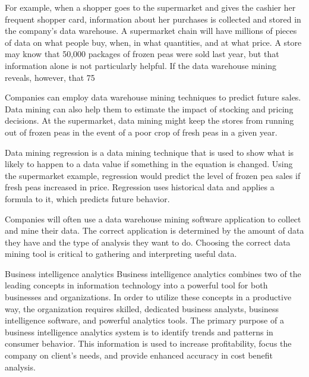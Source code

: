 For example, when a shopper goes to the supermarket and gives the cashier her frequent shopper card, information about her purchases is collected and stored in the company's data warehouse. A supermarket chain will have millions of pieces of data on what people buy, when, in what quantities, and at what price. A store may know that 50,000 packages of frozen peas were sold last year, but that information alone is not particularly helpful. If the data warehouse mining reveals, however, that 75%
 
Companies can employ data warehouse mining techniques to predict future sales. Data mining can also help them to estimate the impact of stocking and pricing decisions. At the supermarket, data mining might keep the stores from running out of frozen peas in the event of a poor crop of fresh peas in a given year.
 
Data mining regression is a data mining technique that is used to show what is likely to happen to a data value if something in the equation is changed. Using the supermarket example, regression would predict the level of frozen pea sales if fresh peas increased in price. Regression uses historical data and applies a formula to it, which predicts future behavior.
 
Companies will often use a data warehouse mining software application to collect and mine their data. The correct application is determined by the amount of data they have and the type of analysis they want to do. Choosing the correct data mining tool is critical to gathering and interpreting useful data.

Business intelligence analytics
Business intelligence analytics combines two of the leading concepts in information technology into a powerful tool for both businesses and organizations. In order to utilize these concepts in a productive way, the organization requires skilled, dedicated business analysts, business intelligence software, and powerful analytics tools. The primary purpose of a business intelligence analytics system is to identify trends and patterns in consumer behavior. This information is used to increase profitability, focus the company on client's needs, and provide enhanced accuracy in cost benefit analysis.
 
